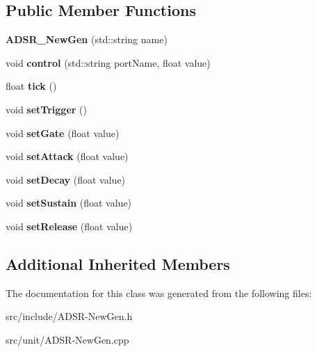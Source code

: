 \subsection*{Public Member Functions}
\begin{DoxyCompactItemize}
\item 
\hypertarget{classunit_1_1ADSR__NewGen_ac8dbe9f3fab627d291ed34996e97d73e}{{\bfseries A\-D\-S\-R\-\_\-\-New\-Gen} (std\-::string name)}\label{classunit_1_1ADSR__NewGen_ac8dbe9f3fab627d291ed34996e97d73e}

\item 
\hypertarget{classunit_1_1ADSR__NewGen_ae5d3a6e3e2be04a470eeb30767e11a58}{void {\bfseries control} (std\-::string port\-Name, float value)}\label{classunit_1_1ADSR__NewGen_ae5d3a6e3e2be04a470eeb30767e11a58}

\item 
\hypertarget{classunit_1_1ADSR__NewGen_a9ec42e7edded490dbe69cbe93883b168}{float {\bfseries tick} ()}\label{classunit_1_1ADSR__NewGen_a9ec42e7edded490dbe69cbe93883b168}

\item 
\hypertarget{classunit_1_1ADSR__NewGen_af3002642e550abcfe4be667d027670a9}{void {\bfseries set\-Trigger} ()}\label{classunit_1_1ADSR__NewGen_af3002642e550abcfe4be667d027670a9}

\item 
\hypertarget{classunit_1_1ADSR__NewGen_a222a12be57cca522ece84deac512c330}{void {\bfseries set\-Gate} (float value)}\label{classunit_1_1ADSR__NewGen_a222a12be57cca522ece84deac512c330}

\item 
\hypertarget{classunit_1_1ADSR__NewGen_aa725e7a7c15ac05c643f3a9df9542c66}{void {\bfseries set\-Attack} (float value)}\label{classunit_1_1ADSR__NewGen_aa725e7a7c15ac05c643f3a9df9542c66}

\item 
\hypertarget{classunit_1_1ADSR__NewGen_aa43684929b80892b7d91ec75303fd00c}{void {\bfseries set\-Decay} (float value)}\label{classunit_1_1ADSR__NewGen_aa43684929b80892b7d91ec75303fd00c}

\item 
\hypertarget{classunit_1_1ADSR__NewGen_a91036e95f48e88f71973dced76097563}{void {\bfseries set\-Sustain} (float value)}\label{classunit_1_1ADSR__NewGen_a91036e95f48e88f71973dced76097563}

\item 
\hypertarget{classunit_1_1ADSR__NewGen_af7e268918cef20f67514df7356f0fb15}{void {\bfseries set\-Release} (float value)}\label{classunit_1_1ADSR__NewGen_af7e268918cef20f67514df7356f0fb15}

\end{DoxyCompactItemize}
\subsection*{Additional Inherited Members}


The documentation for this class was generated from the following files\-:\begin{DoxyCompactItemize}
\item 
src/include/A\-D\-S\-R-\/\-New\-Gen.\-h\item 
src/unit/A\-D\-S\-R-\/\-New\-Gen.\-cpp\end{DoxyCompactItemize}
